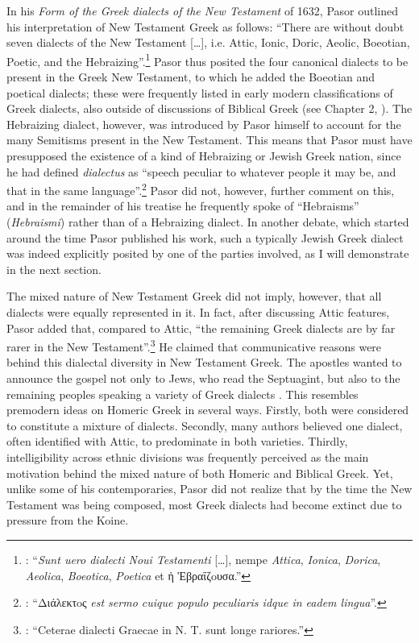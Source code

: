 In his \textit{Form of the Greek dialects of the New Testament} of 1632, Pasor outlined his interpretation of New Testament Greek as follows: “There are without doubt seven dialects of the New Testament […], i.e. Attic, Ionic, Doric, Aeolic, Boeotian, Poetic, and the Hebraizing”.\footnote{\citet[1--2]{Pasor1632}: “\textit{Sunt uero dialecti Noui Testamenti} […], nempe \textit{Attica}, \textit{Ionica}, \textit{Dorica}, \textit{Aeolica}, \textit{Boeotica}, \textit{Poetica} et ἡ Ἑβραΐζoυσα.”} Pasor thus posited the four canonical dialects to be present in the Greek New Testament, to which he added the Boeotian and poetical dialects; these were frequently listed in early modern classifications of Greek dialects, also outside of discussions of Biblical Greek (see Chapter 2, ). The Hebraizing dialect, however, was introduced by Pasor himself to account for the many Semitisms present in the New Testament. This means that Pasor must have presupposed the existence of a kind of Hebraizing or Jewish Greek nation, since he had defined \textit{dialectus} as “speech peculiar to whatever people it may be, and that in the same language”.\footnote{\citet[1]{Pasor1632}: “Διάλεκτoς \textit{est sermo cuique populo peculiaris idque in eadem lingua}”.} Pasor did not, however, further comment on this, and in the remainder of his treatise he frequently spoke of “Hebraisms” (\textit{Hebraismi}) rather than of a Hebraizing dialect. In another debate, which started around the time Pasor published his work, such a typically Jewish Greek dialect was indeed explicitly posited by one of the parties involved, as I will demonstrate in the next section.

The mixed nature of New Testament Greek did not imply, however, that all dialects were equally represented in it. In fact, after discussing Attic features, Pasor added that, compared to Attic, “the remaining Greek dialects are by far rarer in the New Testament”.\footnote{\citet[24]{Pasor1632}: “Ceterae dialecti Graecae in N. T. sunt longe rariores.”} He claimed that communicative reasons were behind this dialectal diversity in New Testament Greek. The apostles wanted to announce the gospel not only to Jews, who read the Septuagint, but also to the remaining peoples speaking a variety of Greek dialects \citep[143]{Pasor1650}. This resembles premodern ideas on Homeric Greek in several ways. Firstly, both were considered to constitute a mixture of dialects. Secondly, many authors believed one dialect, often identified with Attic, to predominate in both varieties. Thirdly, intelligibility across ethnic divisions was frequently perceived as the main motivation behind the mixed nature of both Homeric and Biblical Greek. Yet, unlike some of his contemporaries, Pasor did not realize that by the time the New Testament was being composed, most Greek dialects had become extinct due to pressure from the Koine.

